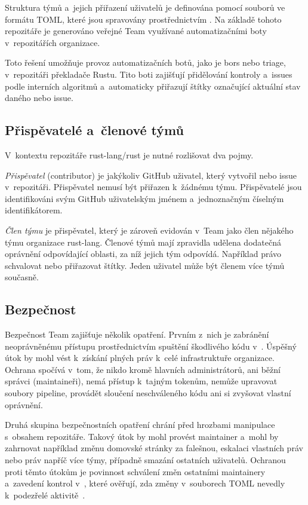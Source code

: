 Struktura týmů a~jejich přiřazení uživatelů je definována pomocí souborů ve formátu TOML, které jsou spravovány prostřednictvím \PR. Na základě tohoto repozitáře je generováno veřejné Team \API využívané automatizačními boty v~repozitářích organizace.

Toto řešení umožňuje provoz automatizačních botů, jako je bors nebo triage, v~repozitáři překladače Rustu. Tito boti zajišťují přidělování kontroly \PR a~issues podle interních algoritmů a~automaticky přiřazují štítky označující aktuální stav daného \PR nebo issue.

\subsection{Přispěvatelé a~členové týmů}
\label{subsec:rust_team_api:contributors_members}

V~kontextu repozitáře rust-lang/rust je nutné rozlišovat dva pojmy.

\emph{Přispěvatel} (contributor) je jakýkoliv GitHub uživatel, který vytvořil \PR nebo issue v~repozitáři. Přispěvatel nemusí být přiřazen k~žádnému týmu. Přispěvatelé jsou identifikováni svým GitHub uživatelským jménem a~jednoznačným číselným identifikátorem.

\emph{Člen týmu} je přispěvatel, který je zároveň evidován v~Team \API jako člen nějakého týmu organizace rust-lang. Členové týmů mají zpravidla udělena dodatečná oprávnění odpovídající oblasti, za níž jejich tým odpovídá. Například právo schvalovat \PR nebo přiřazovat štítky. Jeden uživatel může být členem více týmů současně.

\subsection{Bezpečnost}
\label{subsec:rust_team_api:security}

Bezpečnost Team \API zajišťuje několik opatření. Prvním z~nich je zabránění neoprávněnému přístupu prostřednictvím spuštění škodlivého kódu v~\CI. Úspěšný útok by mohl vést k~získání plných práv k~celé infrastruktuře organizace. Ochrana spočívá v~tom, že nikdo kromě hlavních administrátorů, ani běžní správci (maintaineři), nemá přístup k~tajným tokenům, nemůže upravovat soubory pipeline, provádět sloučení neschváleného kódu ani si zvyšovat vlastní oprávnění.

Druhá skupina bezpečnostních opatření chrání před hrozbami manipulace s~obsahem repozitáře. Takový útok by mohl provést maintainer a~mohl by zahrnovat například změnu \URL domovské stránky za falešnou, eskalaci vlastních práv nebo práv napříč více týmy, případně smazání ostatních uživatelů. Ochranou proti těmto útokům je povinnost schválení změn ostatními maintainery a~zavedení kontrol v~\CI, které ověřují, zda změny v~souborech TOML nevedly k~podezřelé aktivitě~\cite{rust_team_docs}.

